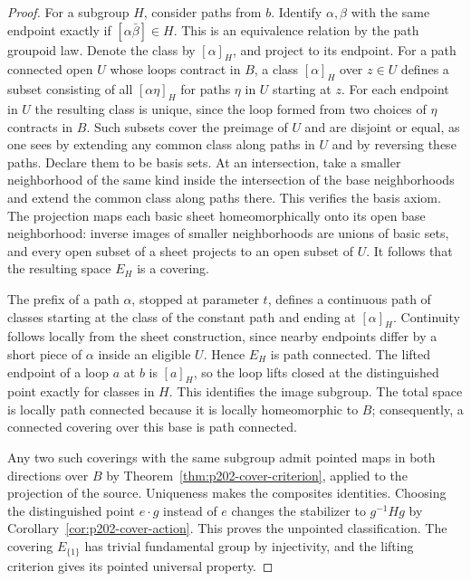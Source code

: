 \documentclass[11pt,oneside,openany]{book}
\theoremstyle{plain}
\theoremstyle{definition}
\theoremstyle{remark}
\begin{document}
\begin{proof}
For a subgroup \(H\), consider paths from \(b\).
Identify \(\alpha,\beta\) with the same endpoint exactly if
\([\alpha\bar\beta]\in H\). This is an equivalence relation
by the path groupoid law. Denote the class by
\([\alpha]_H\), and project to its endpoint. For a path
connected open \(U\) whose loops contract in \(B\), a class
\([\alpha]_H\) over \(z\in U\) defines a subset consisting of
all \([\alpha\eta]_H\) for paths \(\eta\) in \(U\) starting at
\(z\). For each endpoint in \(U\) the resulting class is
unique, since the loop formed from two choices of \(\eta\)
contracts in \(B\). Such subsets cover the preimage of \(U\)
and are disjoint or equal, as one sees by extending any
common class along paths in \(U\) and by reversing these
paths. Declare them to be basis sets. At an intersection,
take a smaller neighborhood of the same kind inside the
intersection of the base neighborhoods and extend the
common class along paths there. This verifies the basis
axiom. The projection maps each basic sheet homeomorphically
onto its open base neighborhood: inverse images of smaller
neighborhoods are unions of basic sets, and every open
subset of a sheet projects to an open subset of \(U\).
It follows that the resulting space \(E_H\) is a covering.

The prefix of a path \(\alpha\), stopped at parameter \(t\),
defines a continuous path of classes starting at the class
of the constant path and ending at \([\alpha]_H\). Continuity
follows locally from the sheet construction, since nearby
endpoints differ by a short piece of \(\alpha\) inside an
eligible \(U\). Hence \(E_H\) is path connected. The lifted
endpoint of a loop \(a\) at \(b\) is \([a]_H\), so the loop
lifts closed at the distinguished point exactly for classes
in \(H\). This identifies the image subgroup. The total
space is locally path connected because it is locally
homeomorphic to \(B\); consequently, a connected covering
over this base is path connected.

Any two such coverings with the same subgroup admit pointed
maps in both directions over \(B\) by
Theorem~\ref{thm:p202-cover-criterion}, applied to the
projection of the source. Uniqueness makes the composites
identities. Choosing the distinguished point \(e\cdot g\)
instead of \(e\) changes the stabilizer to \(g^{-1}Hg\) by
Corollary~\ref{cor:p202-cover-action}. This proves the
unpointed classification. The covering \(E_{\{1\}}\) has
trivial fundamental group by injectivity, and the lifting
criterion gives its pointed universal property.
\end{proof}
\end{document}
